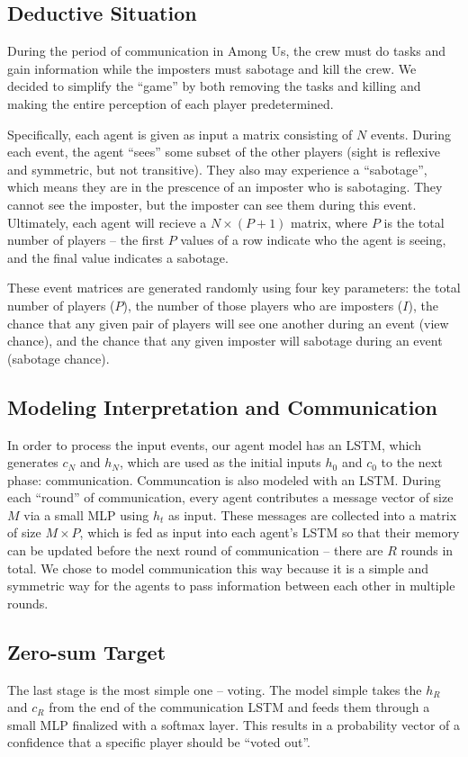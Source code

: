 \documentclass[10pt,twocolumn,letterpaper]{article}
\begin{document}
\subsection{Deductive Situation}
During the period of communication in Among Us, the crew must do tasks
and gain information while the imposters must sabotage and kill the crew. We decided
to simplify the ``game'' by both removing the tasks and killing and making the entire
perception of each player predetermined. 

Specifically, each agent is given as input a matrix consisting
of $N$ events. During each event, the agent ``sees'' some subset of the other players
(sight is reflexive and symmetric, but not transitive).
They also may experience a ``sabotage'', which means they are in the prescence
of an imposter who is sabotaging. They cannot see the imposter, but the imposter
can see them during this event. Ultimately, each agent will recieve
a $N \times (P + 1)$ matrix, where $P$ is the total number of players -- the first
$P$ values of a row indicate who the agent is seeing, and the final value indicates
a sabotage.

These event matrices are generated randomly using four key parameters: the total number
of players ($P$), the number of those players who are imposters ($I$), the chance that
any given pair of players will see one another during an event (view chance), and the 
chance that any given imposter will sabotage during an  event (sabotage chance).

\subsection{Modeling Interpretation and Communication}
In order to process the input events, our agent model has an LSTM, which
generates $c_N$ and $h_N$, which are used as the initial inputs
$h_0$ and $c_0$ to the next phase:
communication. Communcation is also modeled with an LSTM. During each ``round''
of communication, every agent contributes a message vector of size $M$ via
a small MLP using $h_t$ as input. These messages are collected into a matrix
of size $M \times P$, which is fed as input into each agent's LSTM so that
their memory can be updated before the next round of communication -- there
are $R$ rounds in total. We chose
to model communication this way because it is a simple and symmetric way for the agents
to pass information between each other in multiple rounds.
   
\subsection{Zero-sum Target}
The last stage is the most simple one -- voting. The model simple takes the $h_R$ and
$c_R$ from the end of the communication LSTM and feeds them through
a small MLP finalized with a softmax layer. This results in a probability vector
of a confidence that a specific player should be ``voted out''.
\end{document}
